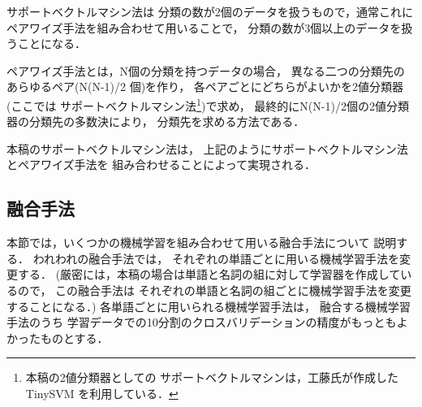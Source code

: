 サポートベクトルマシン法は
分類の数が2個のデータを扱うもので，通常これに
ペアワイズ手法を組み合わせて用いることで，
分類の数が3個以上のデータを扱うことになる\cite{kudoh_chunk_nl2000}．

ペアワイズ手法とは，N個の分類を持つデータの場合，
異なる二つの分類先のあらゆるペア(N(N-1)/2 個)を作り，
各ペアごとにどちらがよいかを2値分類器(ここでは
サポートベクトルマシン法\footnote{本稿の2値分類器としての
サポートベクトルマシンは，工藤氏が作成した TinySVM\cite{kudoh_svm} を利用している．})で求め，
最終的にN(N-1)/2個の2値分類器の分類先の多数決により，
分類先を求める方法である．

本稿のサポートベクトルマシン法は，
上記のようにサポートベクトルマシン法とペアワイズ手法を
組み合わせることによって実現される．

\subsection{融合手法}
\label{sec:yuugou}

本節では，いくつかの機械学習を組み合わせて用いる融合手法について
説明する．
われわれの融合手法では，
それぞれの単語ごとに用いる機械学習手法を変更する．
(厳密には，本稿の場合は単語と名詞の組に対して学習器を作成しているので，
この融合手法は
それぞれの単語と名詞の組ごとに機械学習手法を変更することになる．)
各単語ごとに用いられる機械学習手法は，
融合する機械学習手法のうち
学習データでの10分割のクロスバリデーションの精度がもっともよかったものとする．

